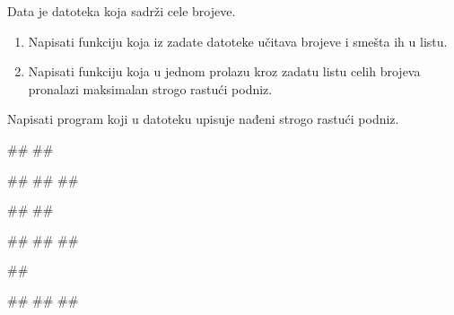 \begin{Exercise}[difficulty=1,label=4_05]
Data je datoteka  koja sadrži cele brojeve.
\begin{enumerate}
 \item Napisati funkciju koja iz zadate datoteke učitava brojeve i smešta ih u listu.
 \item Napisati funkciju koja u jednom prolazu kroz zadatu listu celih brojeva 
pronalazi maksimalan strogo rastući podniz.
\end{enumerate}
Napisati program koji u datoteku  upisuje nađeni strogo rastući podniz.


\begin{minitest}
\begin{test}{1}
##
##

#\naslovIzlaz#
##
##
\end{test}
\end{minitest}
\begin{minitest}
\begin{test}{2}
##
##

#\naslovIzlazZaGresku#
##
##
\end{test}
\end{minitest}
\begin{minitest}
\begin{test}{3}
##

#\naslovIzlaz#
##
##
\end{test}
\end{minitest}
\end{Exercise}




